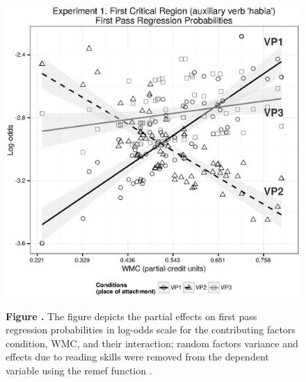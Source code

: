 \documentclass{frontiersSCNS}\usepackage{knitr}
\begin{document}
\begin{figure}
\begin{center}
\includegraphics{figure/graphics-fprp-auxV-exp1-graph.eps} 
\end{center}
\textbf{\label{fig:fprp-auxV-exp1-graph} Figure .}{ The figure depicts the  partial effects on first pass regression probabilities in log-odds scale for the contributing factors condition, WMC, and their interaction;  random factors variance and effects due to reading skills were removed from the dependent variable using the remef function \citep{HohensteinReinhold2013}.}
\end{figure}
\end{document}
